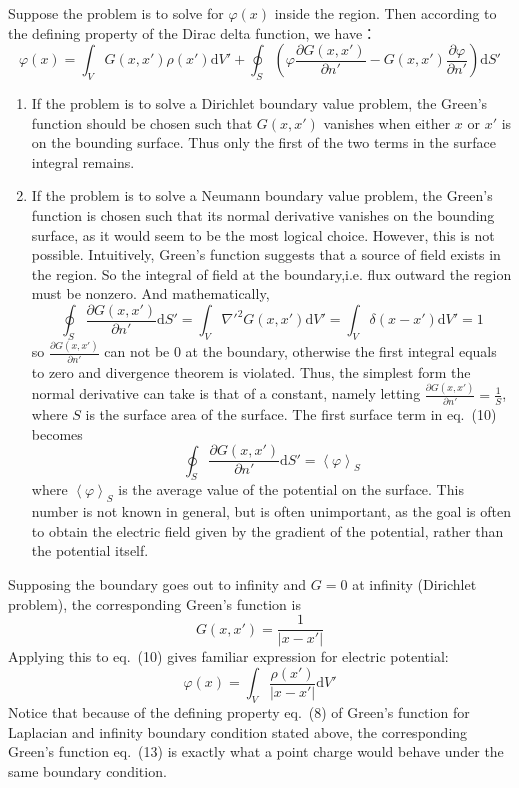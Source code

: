 \documentclass[a4paper]{article}
\begin{document}
Suppose the problem is to solve for $\varphi(x)$ inside the region. Then according to the defining property of the Dirac delta function, we have：
\begin{equation}
\varphi(x)=\int_V G(x,x')\rho(x')\mathrm{d}V'+\oint_S\left(\varphi\frac{\partial G(x,x')}{\partial n'}-G(x,x')\frac{\partial \varphi}{\partial n'}\right)\mathrm{d}S'
\end{equation}
\begin{enumerate}
\item If the problem is to solve a Dirichlet boundary value problem, the Green's function should be chosen such that $G(x,x')$ vanishes when either $x$ or $x'$ is on the bounding surface. Thus only the first of the two terms in the surface integral remains.
\item If the problem is to solve a Neumann boundary value problem, the Green's function is chosen such that its normal derivative vanishes on the bounding surface, as it would seem to be the most logical choice. However, this is not possible. Intuitively, Green's function suggests that a source of field exists in the region. So the integral of field at the boundary,i.e. flux outward the region must be nonzero. And mathematically,
\begin{equation}
\oint_S \frac{\partial G(x,x')}{\partial n'}\mathrm{d}S'=\int_V \nabla'^2 G(x,x')\mathrm{d}V'=\int_V \delta(x-x')\mathrm{d}V'=1
\end{equation}
so $\frac{\partial G(x,x')}{\partial n'}$ can not be 0 at the boundary, otherwise the first integral equals to zero and divergence theorem is violated. Thus, the simplest form the normal derivative can take is that of a constant, namely letting $\frac{\partial G(x,x')}{\partial n'}=\frac{1}{S}$, where $S$ is the surface area of the surface. The first surface term in eq.~(10) becomes 
\begin{equation}
\oint_S \frac{\partial G(x,x')}{\partial n'}\mathrm{d}S'=\left<\varphi\right>_S
\end{equation}
where $\left<\varphi\right>_S$ is the average value of the potential on the surface. This number is not known in general, but is often unimportant, as the goal is often to obtain the electric field given by the gradient of the potential, rather than the potential itself.
\end{enumerate}

Supposing the boundary goes out to infinity and $G=0$ at infinity (Dirichlet problem), the corresponding Green's function is
\begin{equation}
G(x,x')=\frac{1}{\lvert x-x' \rvert}
\end{equation}
Applying this to eq.~(10) gives familiar expression for electric potential:
\begin{equation}
\varphi(x)=\int_V \frac{\rho(x')}{\lvert x-x' \rvert}\mathrm{d}V'
\end{equation}
Notice that because of the defining property eq.~(8) of Green's function for Laplacian and infinity boundary condition stated above, the corresponding Green's function eq.~(13) is exactly what a point charge would behave under the same boundary condition.
\end{document}
